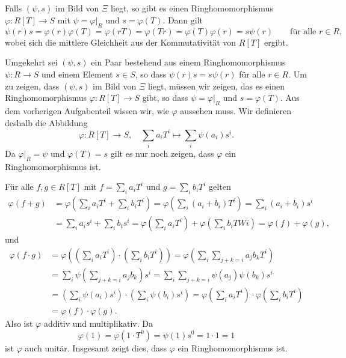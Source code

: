 \documentclass[a4paper, 10pt, numbers=noenddot]{scrartcl}
\begin{document}
\subsection{}

Falls $(\psi, s)$ im Bild von $\Xi$ liegt, so gibt es einen Ringhomomorphismus $\varphi \colon R[T] \to S$ mit $\psi = \varphi|_R$ und $s = \varphi(T)$.
Dann gilt
\[
    \psi(r) s
  = \varphi(r) \varphi(T)
  = \varphi(r T)
  = \varphi(T r)
  = \varphi(T) \varphi(r)
  = s \psi(r)
  \qquad
  \text{für alle $r \in R$},
\]
wobei sich die mittlere Gleichheit aus der Kommutativität von $R[T]$ ergibt.

Umgekehrt sei $(\psi, s)$ ein Paar bestehend aus einem Ringhomomorphismus $\psi \colon R \to S$ und einem Element $s \in S$, so dass $\psi(r) s = s \psi(r)$ für alle $r \in R$.
Um zu zeigen, dass $(\psi, s)$ im Bild von $\Xi$ liegt, müssen wir zeigen, das es einen Ringhomomorphismus $\varphi \colon R[T] \to S$ gibt, so dass $\psi = \varphi|_R$ und $s = \varphi(T)$.
Aus dem vorherigen Aufgabenteil wissen wir, wie $\varphi$ aussehen muss.
Wir definieren deshalb die Abbildung
\[
  \varphi \colon R[T] \to S,
  \quad
  \sum_i a_i T^i \mapsto \sum_i \psi(a_i) s^i.
\]
Da $\varphi|_R = \psi$ und $\varphi(T) = s$ gilt es nur noch zeigen, dass $\varphi$ ein Ringhomomorphismus ist.

Für alle $f, g \in R[T]$ mit $f = \sum_i a_i T^i$ und $g = \sum_i b_i T^i$ gelten
\begin{align*}
      \varphi(f + g)
  &=  \varphi\left( \sum_i a_i T^i + \sum_i b_i T^i \right)
   =  \varphi\left( \sum_i (a_i + b_i) T^i \right)
   =  \sum_i (a_i + b_i) s^i
  \\
  &=  \sum_i a_i s^i + \sum_i b_i s^i
   =  \varphi\left( \sum_i a_i T^i \right) + \varphi\left( \sum_i b_i TWi \right)
   =  \varphi(f) + \varphi(g),
\end{align*}
und
\begin{align*}
    \varphi(f \cdot g)
  &= \varphi\left( \left( \sum_i a_i T^i \right) \cdot \left( \sum_i b_i T^i \right) \right)
   = \varphi\left( \sum_i \sum_{j + k = i} a_j b_k T^i \right)
  \\
  &= \sum_i \psi\left( \sum_{j + k = i} a_j b_k \right) s^i
   = \sum_i \sum_{j + k = i} \psi(a_j) \psi(b_k) s^i
  \\
  &= \left( \sum_i \psi(a_i) s^i \right) \cdot \left( \sum_i \psi(b_i) s^i \right)
   = \varphi\left( \sum_i a_i T^i \right) \cdot \varphi\left( \sum_i b_i T^i \right)
  \\
  &= \varphi(f) \cdot \varphi(g).
\end{align*}
Also ist $\varphi$ additiv und multiplikativ.
Da
\[
    \varphi(1)
  = \varphi(1 \cdot T^0)
  = \psi(1) s^0
  = 1 \cdot 1
  = 1
\]
ist $\varphi$ auch unitär.
Insgesamt zeigt dies, dass $\varphi$ ein Ringhomomorphismus ist.
\end{document}
